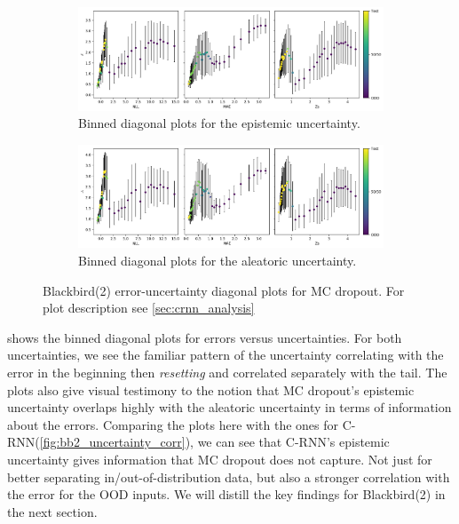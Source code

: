 \begin{figure}[htbp]
  \centering
    \begin{subfigure}[b]{\textwidth}
        \includegraphics[width=\textwidth]{Experiments/figs/binned/bb2_dropout_epistemic.png}
        \caption{Binned diagonal plots for the epistemic uncertainty.}
    \end{subfigure}
    
    \begin{subfigure}[b]{\textwidth}
        \includegraphics[width=\textwidth]{Experiments/figs/binned/bb2_dropout_aleatoric.png}
        \caption{Binned diagonal plots for the aleatoric uncertainty.}
  \end{subfigure}
    \caption[Blackbird(2) error-uncertainty diagonal plots for MC dropout]{Blackbird(2) error-uncertainty diagonal plots for MC dropout. For plot description see \cref{sec:crnn_analysis}}
    \label{fig:bb2_dropout_uncertainty_corr}
\end{figure}

 shows the binned diagonal plots for errors versus uncertainties. For both uncertainties, we see the familiar pattern of the uncertainty correlating with the error in the beginning then \emph{resetting} and correlated separately with the tail. The plots also give visual testimony to the notion that MC dropout's epistemic uncertainty overlaps highly with the aleatoric uncertainty in terms of information about the errors. Comparing the plots here with the ones for C-RNN(\cref{fig:bb2_uncertainty_corr}), we can see that C-RNN's epistemic uncertainty gives information that MC dropout does not capture. Not just for better separating in/out-of-distribution data, but also  a stronger correlation with the error for the OOD inputs. We will distill the key findings for Blackbird(2) in the next section. 

